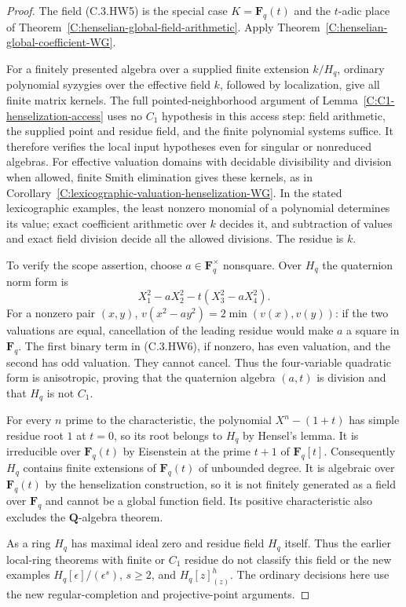 \begin{proof}
The field (C.3.HW5) is the special
case $K=\mathbf F_q(t)$ and the
$t$-adic place of
Theorem~\ref{C:henselian-global-field-arithmetic}.
Apply Theorem~\ref{C:henselian-global-coefficient-WG}.

For a finitely presented algebra
over a supplied finite extension
$k/H_q$, ordinary polynomial
syzygies over the effective field
$k$, followed by localization,
give all finite matrix kernels.
The full pointed-neighborhood
argument of
Lemma~\ref{C:C1-henselization-access}
uses no $C_1$ hypothesis in this
access step: field arithmetic,
the supplied point and residue
field, and the finite polynomial
systems suffice.  It therefore
verifies the local input hypotheses
even for singular or nonreduced
algebras.
For effective valuation domains
with decidable divisibility and
division when allowed, finite
Smith elimination gives these
kernels, as in
Corollary~\ref{C:lexicographic-valuation-henselization-WG}.
In the stated lexicographic
examples, the least nonzero
monomial of a polynomial determines
its value; exact coefficient
arithmetic over $k$ decides it,
and subtraction of values and
exact field division decide all
the allowed divisions.
The residue is $k$.

To verify the scope assertion,
choose $a\in\mathbf F_q^\times$
nonsquare.  Over $H_q$ the
quaternion norm form is
\[
       X_1^2-aX_2^2-t(X_3^2-aX_4^2).                  \tag{C.3.HW6}
\]
For a nonzero pair $(x,y)$,
$v(x^2-ay^2)=2\min(v(x),v(y))$:
if the two valuations are equal,
cancellation of the leading
residue would make $a$ a square
in $\mathbf F_q$.
The first binary term in
(C.3.HW6), if nonzero, has
even valuation, and the second
has odd valuation.
They cannot cancel.
Thus the four-variable quadratic
form is anisotropic, proving
that the quaternion algebra
$(a,t)$ is division and that
$H_q$ is not $C_1$.

For every $n$ prime to the
characteristic, the polynomial
$X^n-(1+t)$ has simple residue
root $1$ at $t=0$, so its root
belongs to $H_q$ by Hensel's
lemma.  It is irreducible over
$\mathbf F_q(t)$ by Eisenstein
at the prime $t+1$ of
$\mathbf F_q[t]$.
Consequently $H_q$ contains
finite extensions of
$\mathbf F_q(t)$ of unbounded
degree.  It is algebraic over
$\mathbf F_q(t)$ by the
henselization construction,
so it is not finitely generated
as a field over $\mathbf F_q$
and cannot be a global function
field.  Its positive characteristic
also excludes the $\mathbf Q$-algebra
theorem.

As a ring $H_q$ has maximal
ideal zero and residue field
$H_q$ itself.  Thus the earlier
local-ring theorems with finite
or $C_1$ residue do not classify
this field or the new examples
$H_q[\epsilon]/(\epsilon^s)$,
$s\ge2$, and
$H_q[z]_{(z)}^h$.
The ordinary decisions here use
the new regular-completion and
projective-point arguments.
\end{proof}
